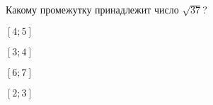 \begin{ex}
	Какому промежутку принадлежит число $\sqrt{37}$?
	
	\selectanswer
	\begin{enumcols}[columns=4]
		\item $[4;5]$
		\item $[3;4]$
		\item $[6;7]$
		\item $[2;3]$
	\end{enumcols}
\end{ex}